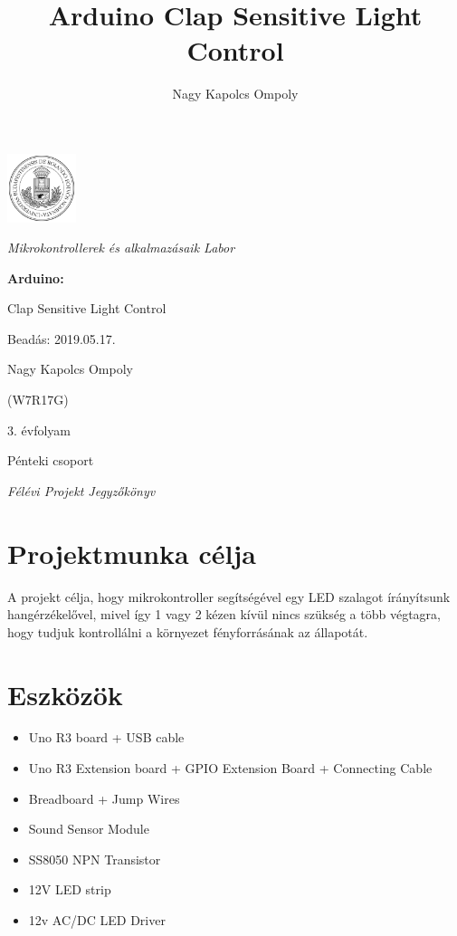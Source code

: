 \documentclass[a4paper,11pt]{article}
\author{Nagy Kapolcs Ompoly}
\title{Arduino Clap Sensitive Light Control}
\date{ }
\begin{document}
\begin{titlepage}
	\centering
	\includegraphics[width=0.15\textwidth]{eltecimer.jpg}\par
	\vspace{1cm}
	{\Large\itshape Mikrokontrollerek és alkalmazásaik Labor\par}
	{\huge\bfseries Arduino: \par Clap Sensitive Light Control\par}
	
	\vfill
	
	\raggedleft
	Beadás: 2019.05.17.\par
	\vspace{0.5cm}
	Nagy Kapolcs Ompoly\par
	(W7R17G)\par
	3. évfolyam\par
	Pénteki csoport\par
	
	\vspace{0.5cm}

	\centering
	{\small\itshape Félévi Projekt Jegyzőkönyv \par}
\end{titlepage}
\clearpage
\setcounter{page}{1}
\newpage
\renewcommand{\thesection}{\Roman{section}}
\renewcommand{\thesubsection}{\thesection.\arabic{subsection}}
\renewcommand{\thesubsubsection}{\thesubsection.\arabic{subsubsection}}
\section{Projektmunka célja}
A projekt célja, hogy mikrokontroller segítségével egy LED szalagot írányítsunk hangérzékelővel, mivel így 1 vagy 2 kézen kívül nincs szükség a több végtagra, hogy tudjuk kontrollálni a környezet fényforrásának az állapotát.

\section{Eszközök}

\begin{itemize}
	\item Uno R3 board + USB cable
	\item Uno R3 Extension board + GPIO Extension Board + Connecting Cable
	\item Breadboard + Jump Wires
	\item Sound Sensor Module 
	\item SS8050 NPN Transistor
	\item 12V LED strip
	\item 12v AC/DC LED Driver
\end{itemize}
\end{document}
